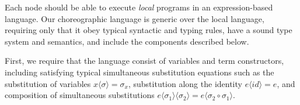 Each node should be able to execute \emph{local} programs in an expression-based language.
Our choreographic language is generic over the local language, requiring only that it obey typical syntactic and typing rules, have a sound type system and semantics, and include the components described below.

First, we require that the language consist of variables and term constructors, including satisfying typical simultaneous substitution equations such as the substitution of variables $x \langle \sigma \rangle = \sigma_x$, substitution along the identity $e \langle  id \rangle = e$, and composition of simultaneous substitutions $e \langle \sigma_1 \rangle \langle \sigma_2 \rangle = e \langle \sigma_2 \circ \sigma_1 \rangle$.

